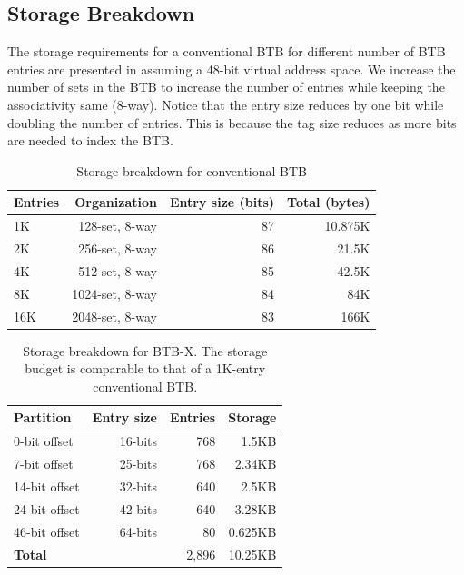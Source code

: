 \subsection{Storage Breakdown}

The storage requirements for a conventional BTB for different number of BTB entries are presented in  assuming a 48-bit virtual address space. We increase the number of sets in the BTB to increase the number of entries while keeping the associativity same (8-way). Notice that the entry size reduces by one bit while doubling the number of entries. This is because the tag size reduces as more bits are needed to index the BTB.

\begin{scriptsize}
\begin{table}[t!]
  \centering
  \caption{Storage breakdown for conventional BTB}
  \label{cal:table:metadata}
  \vspace{-0.1in}
  \begin{tabular}{lrrr} \hline
    \textbf{Entries} & \textbf{Organization} & \textbf{Entry size (bits)}
    & \textbf{Total (bytes)} \\\hline
    1K & 128-set, 8-way & 87 & 10.875K\\\hline
    2K & 256-set, 8-way & 86 & 21.5K\\\hline
    4K & 512-set, 8-way & 85 & 42.5K\\\hline
    8K & 1024-set, 8-way & 84 & 84K\\\hline
    16K & 2048-set, 8-way & 83 & 166K\\\hline
  \end{tabular}
\end{table}
\end{scriptsize}

\begin{scriptsize}
\begin{table}[t!]
  \centering
  \caption{Storage breakdown for BTB-X. The storage budget is comparable to that of a 1K-entry conventional BTB.}
  \label{cal:table:metadata-fdipx}
  \vspace{-0.1in}

    \begin{tabular}{lrrr} \hline
    \textbf{Partition}&\textbf{Entry size}&\textbf{Entries}&\textbf{Storage}\\\hline
    0-bit offset&16-bits&768&1.5KB\\
    7-bit offset&25-bits&768&2.34KB\\
    14-bit offset&32-bits&640&2.5KB\\
    24-bit offset&42-bits&640&3.28KB \\
    46-bit offset&64-bits&80& 0.625KB\\\hline
    \textbf{Total}&&2,896&10.25KB\\\hline
    \end{tabular}

\end{table}
\end{scriptsize}

